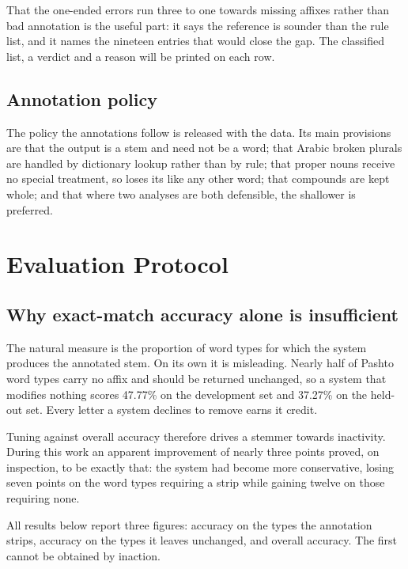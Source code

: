 \documentclass[conference]{IEEEtran}
\newcommand{\ps}[1]{{\pashtofont\textpashto{#1}}}
\begin{document}
That the one-ended errors run three to one towards missing affixes rather than
bad annotation is the useful part: it says the reference is sounder than the
rule list, and it names the nineteen entries that would close the gap. The
classified list, a verdict and a reason will be printed on each row.

\subsection{Annotation policy}

The policy the annotations follow is released with the data. Its main
provisions are that the output is a stem and need not be a word; that Arabic
broken plurals are handled by dictionary lookup rather than by rule; that
proper nouns receive no special treatment, so \ps{افغانستان} loses its
\ps{ستان} like any other word; that compounds are kept whole; and that where
two analyses are both defensible, the shallower is preferred.

\section{Evaluation Protocol}
\label{sec:protocol}

\subsection{Why exact-match accuracy alone is insufficient}

The natural measure is the proportion of word types for which the system
produces the annotated stem. On its own it is misleading. Nearly half of
Pashto word types carry no affix and should be returned unchanged, so a system
that modifies nothing scores 47.77\% on the development set and 37.27\% on the
held-out set. Every letter a system declines to remove earns it credit.

Tuning against overall accuracy therefore drives a stemmer towards inactivity.
During this work an apparent improvement of nearly three points proved, on
inspection, to be exactly that: the system had become more conservative, losing
seven points on the word types requiring a strip while gaining twelve on those
requiring none.

All results below report three figures: accuracy on the types the annotation
strips, accuracy on the types it leaves unchanged, and overall accuracy. The
first cannot be obtained by inaction.
\end{document}

